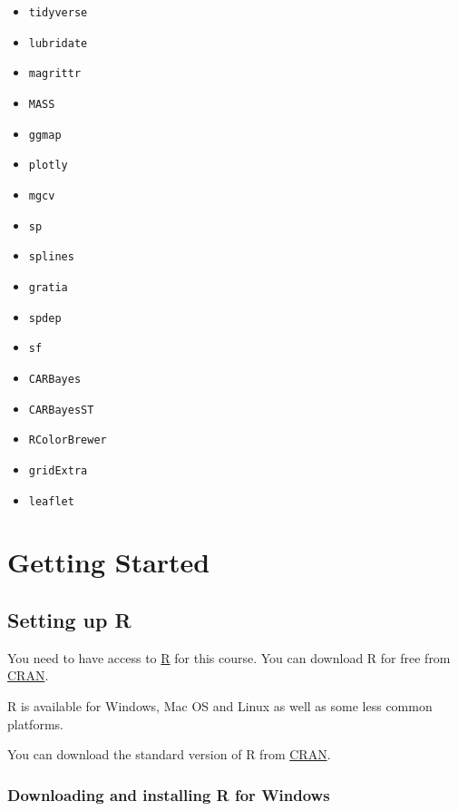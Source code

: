 \documentclass[
]{book}
\providecommand{\tightlist}{%
  \setlength{\itemsep}{0pt}\setlength{\parskip}{0pt}}
\begin{document}
\begin{itemize}
\tightlist
\item
  \texttt{tidyverse}
\item
  \texttt{lubridate}
\item
  \texttt{magrittr}
\item
  \texttt{MASS}
\item
  \texttt{ggmap}
\item
  \texttt{plotly}
\item
  \texttt{mgcv}
\item
  \texttt{sp}
\item
  \texttt{splines}
\item
  \texttt{gratia}
\item
  \texttt{spdep}
\item
  \texttt{sf}
\item
  \texttt{CARBayes}
\item
  \texttt{CARBayesST}
\item
  \texttt{RColorBrewer}
\item
  \texttt{gridExtra}
\item
  \texttt{leaflet}
\end{itemize}

\hypertarget{intro}{%
\chapter{Getting Started}\label{intro}}

\hypertarget{setting-up-r}{%
\section{Setting up R}\label{setting-up-r}}

You need to have access to \href{https://www.r-project.org/}{R} for this course. You can download R for free from \href{https://cran.r-project.org/}{CRAN}.

R is available for Windows, Mac OS and Linux as well as some less common platforms.

You can download the standard version of R from \href{https://cran.r-project.org/}{CRAN}.

\hypertarget{downloading-and-installing-r-for-windows}{%
\subsection{Downloading and installing R for Windows}\label{downloading-and-installing-r-for-windows}}
\end{document}
